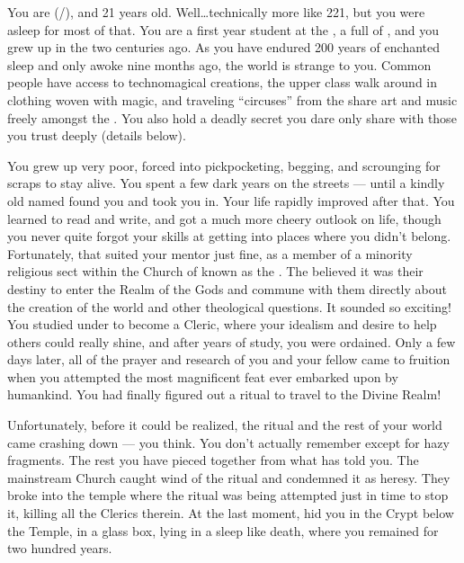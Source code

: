 \documentclass[char]{GL2020}
\begin{document}
\name{\cDisney{}}

You are \cDisney{\full} (\cDisney{\they}/\cDisney{\them}), and 21 years old. Well\ldots{}technically more like 221, but you were asleep for most of that. You are a first year student at the \pSchool{}, a full \cDisney{\cleric} of \cFarmGod{}, and you grew up in the \pFarm{} two centuries ago. As you have endured 200 years of enchanted sleep and only awoke nine months ago, the world is strange to you. Common people have access to technomagical creations, the upper class walk around in clothing woven with magic, and traveling ``circuses'' from the \pTech{} share art and music freely amongst the \pFarmers{}. You also hold a deadly secret you dare only share with those you trust deeply (details below). 

You grew up very poor, forced into pickpocketing, begging, and scrounging for scraps to stay alive. You spent a few dark years on the streets — until a kindly old \cDisneyMentor{\cleric} named \cDisneyMentor{} found you and took you in. Your life rapidly improved after that. You learned to read and write, and got a much more cheery outlook on life, though you never quite forgot your skills at getting into places where you didn't belong. Fortunately, that suited your mentor just fine, as \cDisneyMentor{\theywere} a member of a minority religious sect within the Church of \cFarmGod{} known as the \cDisneySect{}. The \cDisneySect{} believed it was their destiny to enter the Realm of the Gods and commune with them directly about the creation of the world and other theological questions. It sounded so exciting! You studied under \cDisneyMentor{} to become a Cleric, where your idealism and desire to help others could really shine, and after years of study, you were ordained. Only a few days later, all of the prayer and research of you and your fellow \cDisneySect{} came to fruition when you attempted the most magnificent feat ever embarked upon by humankind. You had finally figured out a ritual to travel to the Divine Realm!

Unfortunately, before it could be realized, the ritual and the rest of your world came crashing down — you think. You don't actually remember except for hazy fragments. The rest you have pieced together from what \cWildCard{} has told you. The mainstream Church caught wind of the ritual and condemned it as heresy. They broke into the temple where the ritual was being attempted just in time to stop it, killing all the Clerics therein. At the last moment, \cDisneyMentor{} hid you in the Crypt below the Temple, in a glass box, lying in a sleep like death, where you remained for two hundred years. 
\end{document}
